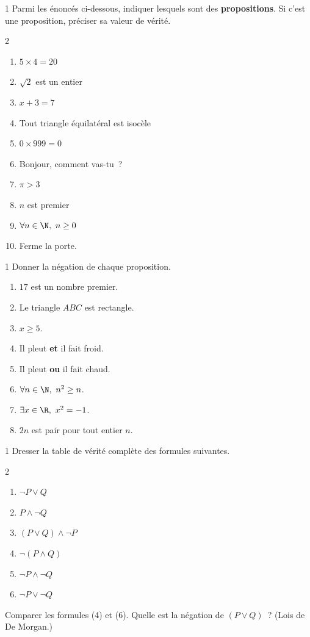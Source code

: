 \begin{exo}{1}
Parmi les \'enonc\'es ci-dessous, indiquer lesquels sont des \textbf{propositions}.
Si c'est une proposition, pr\'eciser sa valeur de v\'erit\'e.
\begin{multicols}{2}
\begin{enumerate}
  \item $5 \times 4 = 20$
  \item $\sqrt{2}$ est un entier
  \item $x + 3 = 7$
  \item Tout triangle \'equilat\'eral est isoc\`ele
  \item $0 \times 999 = 0$
  \item Bonjour, comment vas-tu~?
  \item $\pi > 3$
  \item $n$ est premier
  \item $\forall n \in \N,\ n \geq 0$
  \item Ferme la porte.
\end{enumerate}
\end{multicols}
\end{exo}

\begin{exo}{1}
Donner la n\'egation de chaque proposition.
\begin{enumerate}
  \item $17$ est un nombre premier.
  \item Le triangle $ABC$ est rectangle.
  \item $x \geq 5$.
  \item Il pleut \textbf{et} il fait froid.
  \item Il pleut \textbf{ou} il fait chaud.
  \item $\forall n \in \N,\ n^2 \geq n$.
  \item $\exists x \in \R,\ x^2 = -1$.
  \item $2n$ est pair pour tout entier $n$.
\end{enumerate}
\end{exo}

\begin{exo}{1}
Dresser la table de v\'erit\'e compl\`ete des formules suivantes.
\begin{multicols}{2}
\begin{enumerate}
  \item $\lnot P \lor Q$
  \item $P \land \lnot Q$
  \item $(P \lor Q) \land \lnot P$
  \item $\lnot(P \land Q)$
  \item $\lnot P \land \lnot Q$
  \item $\lnot P \lor \lnot Q$
\end{enumerate}
\end{multicols}
Comparer les formules (4) et (6). Quelle est la n\'egation de
$(P\lor Q)$~? (Lois de De Morgan.)
\end{exo}

